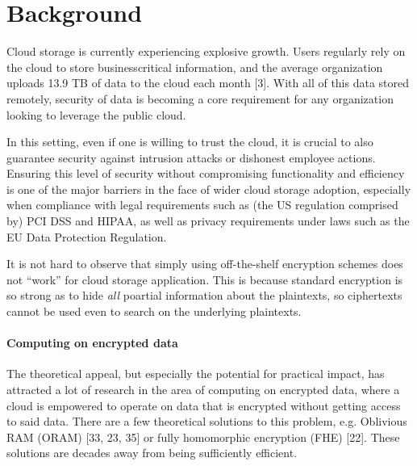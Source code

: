 
\section{Background}
\label{sec:prop_bg}

Cloud storage is currently experiencing explosive growth. Users regularly rely on the cloud to store businesscritical
information, and the average organization uploads 13.9 TB of data to the cloud each month [3].
With all of this data stored remotely, security of data is becoming a core requirement for any organization looking to leverage the public cloud.  

In this setting, even if one is willing to trust the cloud, it is crucial to also guarantee security against intrusion attacks or dishonest employee actions. 
Ensuring this level of security without compromising functionality and efficiency is one of the major barriers in the 
face of wider cloud storage adoption, especially when compliance with legal requirements such as (the US regulation comprised by) PCI DSS and HIPAA, as well as privacy requirements under laws such as the EU Data Protection Regulation. 

It is not hard to observe that simply using off-the-shelf encryption schemes does not “work” for cloud
storage application. This is because standard encryption is so strong as to hide \emph{all} poartial information about the plaintexts, so ciphertexts cannot be used even to search on the underlying plaintexts. 

\paragraph{Computing on encrypted data}
The theoretical appeal, but especially the potential for practical impact, has attracted a lot of research in the area of computing on encrypted data, where a cloud is empowered to operate on data that is encrypted without getting access to said data.
There are a few theoretical solutions to this problem, e.g. Oblivious RAM (ORAM) [33, 23, 35] or fully homomorphic encryption
(FHE) [22]. These solutions are decades away from being sufficiently efficient. 

